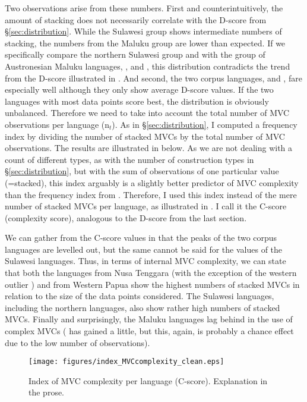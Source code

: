 Two observations arise from these numbers. First and counterintuitively, the amount of stacking does not necessarily correlate with the D-score from §\ref{sec:distribution}. While the Sulawesi group shows intermediate numbers of stacking, the numbers from the Maluku group are lower than expected. If we specifically compare the northern Sulawesi group  and  with the group of Austronesian Maluku languages, ,  and , this distribution contradicts the trend from the D-score illustrated in . And second, the two corpus languages,  and , fare especially well although they only show average D-score values. If the two languages with most data points score best, the distribution is obviously unbalanced. Therefore we need to take into account the total number of MVC observations per language (n$_t$). As in §\ref{sec:distribution}, I computed a frequency index by dividing the number of stacked MVCs by the total number of MVC observations. The results are illustrated in  below. As we are not dealing with a count of different types, as with the number of construction types in §\ref{sec:distribution}, but with the sum of observations of one particular value (=stacked), this index arguably is a slightly better predictor of MVC complexity than the frequency index from . Therefore, I used this index instead of the mere number of stacked MVCs per language, as illustrated in . I call it the C-score (complexity score), analogous to the D-score from the last section.

We can gather from the C-score values in  that the peaks of the two corpus languages are levelled out, but the same cannot be said for the values of the Sulawesi languages. Thus, in terms of internal MVC complexity, we can state that both the languages from Nusa Tenggara (with the exception of the western outlier ) and from Western Papua show the highest numbers of stacked MVCs in relation to the size of the data points considered. The Sulawesi languages, including the northern languages, also show rather high numbers of stacked MVCs. Finally and surprisingly, the Maluku languages lag behind in the use of complex MVCs ( has gained a little, but this, again, is probably a chance effect due to the low number of observations).

\begin{figure}[p]
\texttt{[image: figures/index\_MVCcomplexity\_clean.eps]}
\caption[Index of MVC complexity per language]{Index of MVC complexity per language (C-score). Explanation in the prose.}\label{fig:complexity}
\end{figure}

